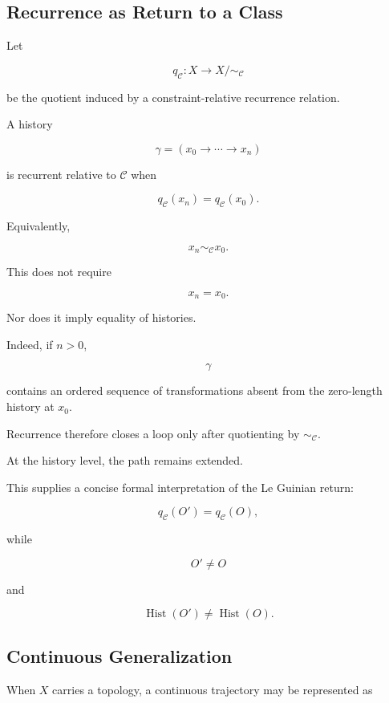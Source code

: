 \documentclass[
  11pt,
  a4paper,
  DIV=12,
  BCOR=0mm,
  parskip=half-
]{scrartcl}
\newcommand{\Hist}{\operatorname{Hist}}
\theoremstyle{definition}
\theoremstyle{plain}
\theoremstyle{remark}
\begin{document}
\subsection{Recurrence as Return to a Class}
\label{app:recurrence-class}

Let

\[
  q_{\mathcal C}:X\to X/{\sim_{\mathcal C}}
\]

be the quotient induced by a constraint-relative recurrence relation.

A history

\[
  \gamma
  =
  (
  x_0\to\cdots\to x_n
  )
\]

is recurrent relative to \(\mathcal C\) when

\[
  q_{\mathcal C}(x_n)
  =
  q_{\mathcal C}(x_0).
\]

Equivalently,

\[
  x_n\sim_{\mathcal C}x_0.
\]

This does not require

\[
  x_n=x_0.
\]

Nor does it imply equality of histories.

Indeed, if \(n>0\),

\[
  \gamma
\]

contains an ordered sequence of transformations absent from the zero-length
history at \(x_0\).

Recurrence therefore closes a loop only after quotienting by
\(\sim_{\mathcal C}\).

At the history level, the path remains extended.

This supplies a concise formal interpretation of the Le Guinian return:

\[
  q_{\mathcal C}(O')
  =
  q_{\mathcal C}(O),
\]

while

\[
  O'\neq O
\]

and

\[
  \Hist(O')\neq\Hist(O).
\]


\subsection{Continuous Generalization}
\label{app:continuous-paths}

When \(X\) carries a topology, a continuous trajectory may be represented as
\end{document}
